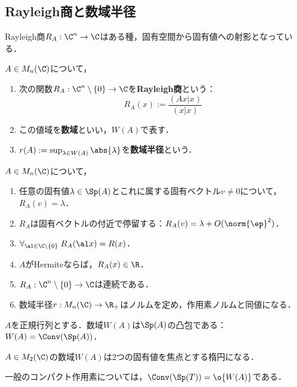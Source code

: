\documentclass[uplatex, dvipdfmx]{jsreport}
\begin{document}
\subsection{Rayleigh商と数域半径}

\begin{tcolorbox}[colframe=ForestGreen, colback=ForestGreen!10!white,breakable,colbacktitle=ForestGreen!40!white,coltitle=black,fonttitle=\bfseries\sffamily,
title=]
    Rayleigh商$R_A:\C^n\to\C$はある種，固有空間から固有値への射影となっている．
\end{tcolorbox}

\begin{definition}
    $A\in M_n(\C)$について，
    \begin{enumerate}
        \item 次の関数$R_A:\C^n\setminus\{0\}\to\C$を\textbf{Rayleigh商}という：
        \[R_A(x):=\frac{(Ax|x)}{(x|x)}\]
        \item この値域を\textbf{数域}といい，$W(A)$で表す．
        \item $r(A):=\sup_{\lambda\in W(A)}\abs{\lambda}$を\textbf{数域半径}という．
    \end{enumerate}
\end{definition}

\begin{lemma}
    $A\in M_n(\C)$について，
    \begin{enumerate}
        \item 任意の固有値$\lambda\in\Sp(A)$とこれに属する固有ベクトル$v\ne0$について，$R_A(v)=\lambda$．
        \item $R_A$は固有ベクトルの付近で停留する：$R_A(v)=\lambda+O(\norm{\ep}^2)$．
        \item $\forall_{\al\in\C\setminus\{0\}}\;R_A(\al x)=R(x)$．
        \item $A$がHermiteならば，$R_A(x)\in\R$．
        \item $R_A:\C^n\setminus\{0\}\to\C$は連続である．
        \item 数域半径$r:M_n(\C)\to\R_+$はノルムを定め，作用素ノルムと同値になる．
    \end{enumerate}
\end{lemma}

\begin{theorem}
    $A$を正規行列とする．数域$W(A)$は$\Sp(A)$の凸包である：$W(A)=\Conv(\Sp(A))$．
\end{theorem}
\begin{example}
    $A\in M_2(\C)$の数域$W(A)$は2つの固有値を焦点とする楕円になる．
\end{example}
\begin{remark}
    一般のコンパクト作用素については，$\Conv(\Sp(T))=\o{W(A)}$である．
\end{remark}
\end{document}
